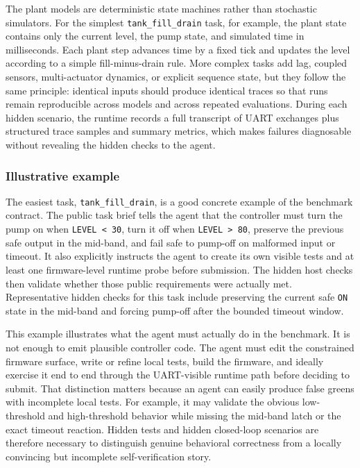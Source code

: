 \documentclass[a4paper,fleqn]{cas-dc}
\DeclareRobustCommand{\tool}[1]{\texttt{\nolinkurl{#1}}}
\begin{document}
The plant models are deterministic state machines rather than stochastic simulators. For the simplest \tool{tank_fill_drain} task, for example, the plant state contains only the current level, the pump state, and simulated time in milliseconds. Each plant step advances time by a fixed tick and updates the level according to a simple fill-minus-drain rule. More complex tasks add lag, coupled sensors, multi-actuator dynamics, or explicit sequence state, but they follow the same principle: identical inputs should produce identical traces so that runs remain reproducible across models and across repeated evaluations. During each hidden scenario, the runtime records a full transcript of UART exchanges plus structured trace samples and summary metrics, which makes failures diagnosable without revealing the hidden checks to the agent.

\subsubsection*{Illustrative example}

The easiest task, \tool{tank_fill_drain}, is a good concrete example of the benchmark contract. The public task brief tells the agent that the controller must turn the pump on when \tool{LEVEL < 30}, turn it off when \tool{LEVEL > 80}, preserve the previous safe output in the mid-band, and fail safe to pump-off on malformed input or timeout. It also explicitly instructs the agent to create its own visible tests and at least one firmware-level runtime probe before submission. The hidden host checks then validate whether those public requirements were actually met. Representative hidden checks for this task include preserving the current safe \tool{ON} state in the mid-band and forcing pump-off after the bounded timeout window.

This example illustrates what the agent must actually do in the benchmark. It is not enough to emit plausible controller code. The agent must edit the constrained firmware surface, write or refine local tests, build the firmware, and ideally exercise it end to end through the UART-visible runtime path before deciding to submit. That distinction matters because an agent can easily produce false greens with incomplete local tests. For example, it may validate the obvious low-threshold and high-threshold behavior while missing the mid-band latch or the exact timeout reaction. Hidden tests and hidden closed-loop scenarios are therefore necessary to distinguish genuine behavioral correctness from a locally convincing but incomplete self-verification story.
\end{document}
